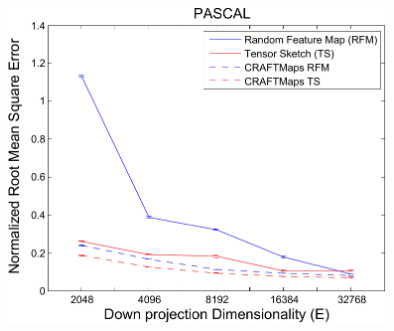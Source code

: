\documentclass[xcolor=x11names,compress,ignorenonframetext,10pt]{beamer}
\renewcommand{\(}{\begin{columns}}
\renewcommand{\)}{\end{columns}}
\newcommand{\<}[1]{\begin{column}{#1}}
\renewcommand{\>}{\end{column}}
\begin{document}
\begin{frame}
    \begin{center}
      \includegraphics[width=0.75\textwidth]{figures/craftmaps/pascal}
    \end{center}
\end{frame}
\end{document}
